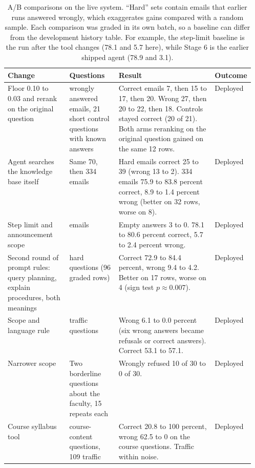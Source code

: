 \begin{table}[htbp]
\centering
\caption[A/B comparisons on the live system]{A/B comparisons on the live system. ``Hard'' sets contain emails that earlier runs answered wrongly, which exaggerates gains compared with a random sample. Each comparison was graded in its own batch, so a baseline can differ from the development history table. For example, the step-limit baseline is the run after the tool changes (78.1 and 5.7 here), while Stage 6 is the earlier shipped agent (78.9 and 3.1).}
\label{tab:live-ab}
\footnotesize
\begin{tabularx}{\linewidth}{@{}>{\raggedright\arraybackslash}p{0.25\linewidth}>{\raggedright\arraybackslash}p{0.2\linewidth}>{\raggedright\arraybackslash}X>{\raggedright\arraybackslash}p{0.11\linewidth}@{}}
\toprule
Change & Questions & Result & Outcome \\
\midrule
Floor 0.10 to 0.03 and rerank on the original question & 49 wrongly answered emails, 21 short control questions with known answers & Correct emails 7, then 15 to 17, then 20. Wrong 27, then 20 to 22, then 18. Controls stayed correct (20 of 21). Both arms reranking on the original question gained on the same 12 rows. & Deployed \\
Agent searches the knowledge base itself & Same 70, then 334 emails & Hard emails correct 25 to 39 (wrong 13 to 2). 334 emails 75.9 to 83.8 percent correct, 8.9 to 1.4 percent wrong (better on 32 rows, worse on 8). & Deployed \\
Step limit and announcement scope & 334 emails & Empty answers 3 to 0. 78.1 to 80.6 percent correct, 5.7 to 2.4 percent wrong. & Deployed \\
Second round of prompt rules: query planning, explain procedures, both meanings & 97 hard questions (96 graded rows) & Correct 72.9 to 84.4 percent, wrong 9.4 to 4.2. Better on 17 rows, worse on 4 (sign test $p\approx0.007$). & Deployed \\
Scope and language rule & 109 traffic questions & Wrong 6.1 to 0.0 percent (six wrong answers became refusals or correct answers). Correct 53.1 to 57.1. & Deployed \\
Narrower scope & Two borderline questions about the faculty, 15 repeats each & Wrongly refused 10 of 30 to 0 of 30. & Deployed \\
Course syllabus tool & 24 course-content questions, 109 traffic & Correct 20.8 to 100 percent, wrong 62.5 to 0 on the course questions. Traffic within noise. & Deployed \\

\end{tabularx}
\end{table}
